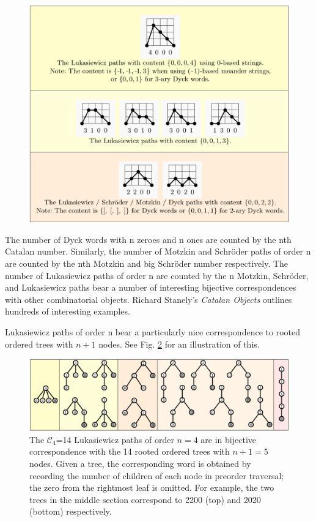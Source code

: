 \begin{figure}[]
	\centering
	\includegraphics[width = .95 \textwidth]{paths.png}
	\caption{}
	\label{paths}
\end{figure}


The number of Dyck words with n zeroes and n ones are counted by the nth Catalan number.  Similarly, the number of Motzkin and Schröder paths of order n are counted by the nth Motzkin and big Schröder number respectively. The number of Lukasiewicz paths of order n are counted by the n
Motzkin, Schröder, and Lukasiewicz paths bear a number of interesting bijective correspondences with other combinatorial objects. Richard Stanely's \emph{Catalan Objects} outlines hundreds of interesting examples.  

Lukasiewicz paths  of order n bear a particularly nice correspondence to rooted ordered trees with $n+1$ nodes. See Fig. \ref{trees} for an illustration of this.

\begin{figure}[]
	\centering
	\includegraphics[width = .95 \textwidth]{trees.png}
	\caption{The $\mathcal{C}_4$=14 Lukasiewicz paths of order $n=4$ are in bijective correspondence with the 14 rooted ordered trees with $n+1=5$ nodes.  Given a tree, the corresponding word is obtained by recording the number of children of each node in preorder traversal; the zero from the rightmost leaf is omitted.  For example, the two trees in the middle section correspond to 2200 (top) and 2020 (bottom) respectively.}
	\label{trees}
\end{figure}


